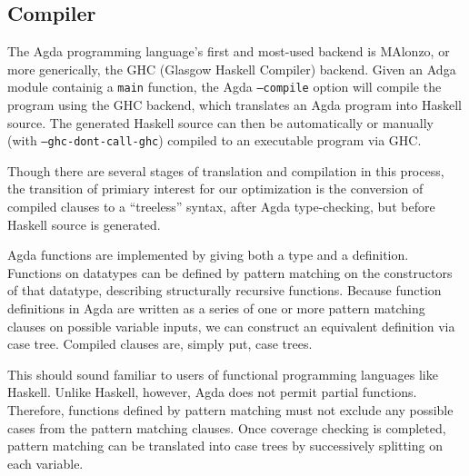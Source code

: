 \subsection{Compiler}

The Agda programming language's first and most-used backend is MAlonzo, or more generically, the GHC (Glasgow Haskell Compiler) backend.\cite{benke2007} Given an Adga module containig a \lstinline{main} function, the Agda \texttt{--compile} option will compile the program using the GHC backend, which translates an Agda program into Haskell source. The generated Haskell source can then be automatically or manually (with \texttt{--ghc-dont-call-ghc}) compiled to an executable program via GHC.\cite{agdadocs} %

Though there are several stages of translation and compilation in this process, the transition of primiary interest for our optimization is the conversion of compiled clauses to a ``treeless'' syntax, after Agda type-checking, but before Haskell source is generated.

Agda functions are implemented by giving both a type and a definition. Functions on datatypes can be defined by pattern matching on the constructors of that datatype, describing structurally recursive functions.\cite{agdawiki} %
Because function definitions in Agda are written as a series of one or more pattern matching clauses on possible variable inputs, we can construct an equivalent definition via case tree.\cite{agdawiki} %
Compiled clauses are, simply put, case trees.

This should sound familiar to users of functional programming languages like Haskell. Unlike Haskell, however, Agda does not permit partial functions. Therefore, functions defined by pattern matching must not exclude any possible cases from the pattern matching clauses.\cite{agdawiki} %
Once coverage checking is completed, pattern matching can be translated into case trees by successively splitting on each variable.\cite{agdahackage} %

